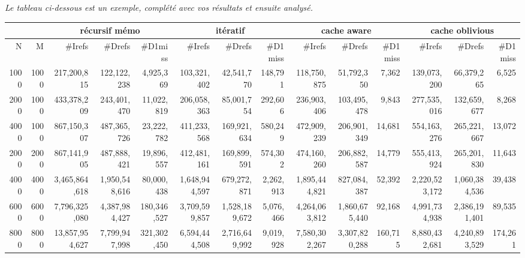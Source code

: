 \documentclass[10pt,a4paper]{article}
\begin{document}
{\em Le tableau ci-dessous est un exemple,  complété avec vos résultats et 
ensuite analysé.}
\\
{\footnotesize
\begin{tabular}{|r|r||r|r|r||r|r|r||r|r|r||r|r|r||}
\hline
 \multicolumn{2}{|c||}{ } 
& \multicolumn{3}{c||}{récursif mémo}
& \multicolumn{3}{c||}{itératif}
& \multicolumn{3}{c||}{cache aware}
& \multicolumn{3}{c||}{cache oblivious}
\\ \hline
N & M 
& \#Irefs & \#Drefs & \#D1miss %
& \#Irefs & \#Drefs & \#D1miss %
& \#Irefs & \#Drefs & \#D1miss %
& \#Irefs & \#Drefs & \#D1miss %
\\ \hline
\hline
1000 & 1000 
& 217,200,815 & 122,122,238 & 4,925,369  %
& 103,321,402 & 42,541,770 & 148,791  %
& 118,750,875 & 51,792,350 & 7,362  %
& 139,073,200 & 66,379,265 & 6,525  %
\\ \hline
2000 & 1000 
& 433,378,209 & 243,401,470 & 11,022,819  %
& 206,058,363 & 85,001,754 & 292,606  %
& 236,903,406 & 103,495,478 & 9,843  %
& 277,535,016 & 132,659,677 & 8,268  %
\\ \hline
4000 & 1000 
& 867,150,307 & 487,365,726 & 23,222,782  %
& 411,233,568 & 169,921,634 & 580,249  %
& 472,909,239 & 206,901,349 & 14,681  %
& 554,163,276 & 265,221,667 & 13,072  %
\\ \hline
2000 & 2000 
& 867,141,905 & 487,888,421 & 19,896,557  %
& 412,481,161 & 169,899,591 & 574,302  %
& 474,160,260 & 206,882,587 & 14,779  %
& 555,413,924 & 265,201,830 & 11,643  %
\\ \hline
4000 & 4000 
& 3,465,864,618 & 1,950,548,616 & 80,000,438  %
& 1,648,944,597 & 679,272,871 & 2,262,913  %
& 1,895,444,821 & 827,084,387 & 52,392  %
& 2,220,523,172 & 1,060,384,536 & 39,438  %
\\ \hline
6000 & 6000 
& 7,796,325,080 & 4,387,984,427 & 180,346,527  %
& 3,709,599,857 & 1,528,189,672 & 5,076,466  %
& 4,264,063,812 & 1,860,675,440 & 92,168  %
& 4,991,734,938 & 2,386,191,401 & 89,535  %
\\ \hline
8000 & 8000 
& 13,857,954,627 & 7,799,947,998 & 321,302,450  %
& 6,594,444,508 & 2,716,649,992 & 9,019,928  %
& 7,580,302,267 & 3,307,820,288 & 160,715  %
& 8,880,432,681 & 4,240,893,529 & 174,261 %
\\ \hline
\hline
\end{tabular}
}
\end{document}
